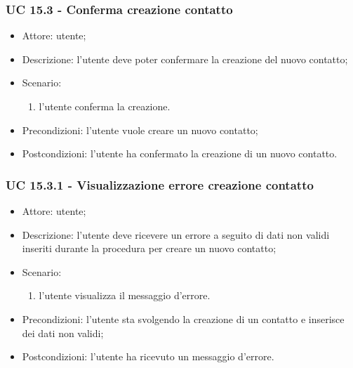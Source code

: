 \subsubsection{UC 15.3 - Conferma creazione contatto} \label{sec: UC 15.3}
\begin{itemize}
    \item Attore: utente;
    \item Descrizione: l'utente deve poter confermare la creazione del nuovo contatto;
    \item Scenario:
        \begin{enumerate}
        \item l'utente conferma la creazione.
        \end{enumerate}
    
    \item Precondizioni: l'utente vuole creare un nuovo contatto;
    \item Postcondizioni: l'utente ha confermato la creazione di un nuovo contatto.
\end{itemize}


\subsubsection{UC 15.3.1 - Visualizzazione errore creazione contatto} \label{sec: UC 15.3.1}
\begin{itemize}
    \item Attore: utente;
    \item Descrizione: l'utente deve ricevere un errore a seguito di dati non validi inseriti durante la procedura per creare un nuovo contatto;
    \item Scenario:
        \begin{enumerate}
        \item l'utente visualizza il messaggio d'errore.
        \end{enumerate}
    
    \item Precondizioni: l'utente sta svolgendo la creazione di un contatto e inserisce dei dati non validi;
    \item Postcondizioni: l'utente ha ricevuto un messaggio d'errore.
\end{itemize}


